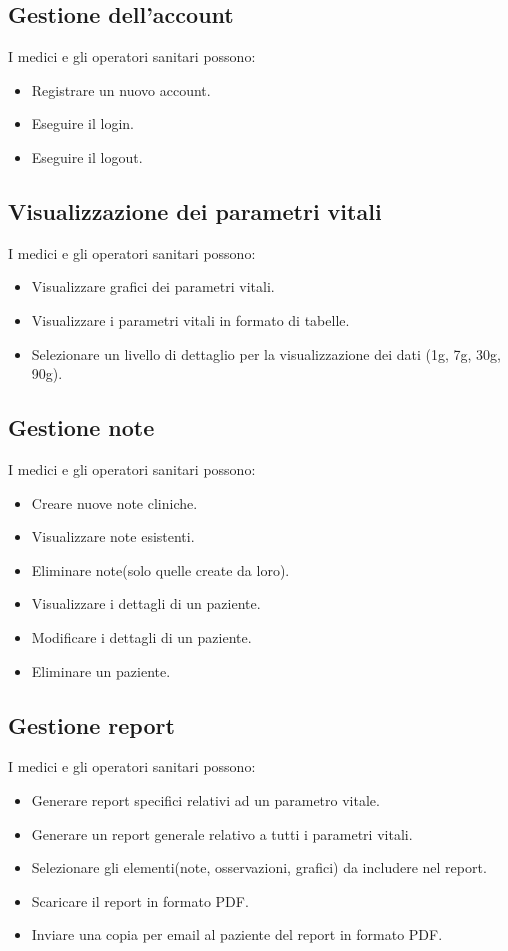 \documentclass[12pt,a4paper,oneside]{report}
\begin{document}
\subsection{Gestione dell'account}
I medici e gli operatori sanitari possono:
\begin{itemize}
    \item Registrare un nuovo account.
    \item Eseguire il login.
    \item Eseguire il logout.
\end{itemize}
\subsection{Visualizzazione dei parametri vitali}
I medici e gli operatori sanitari possono:
\begin{itemize}
    \item Visualizzare grafici dei parametri vitali.
    \item Visualizzare i parametri vitali in formato di tabelle.
    \item Selezionare un livello di dettaglio per la visualizzazione dei dati (1g, 7g, 30g, 90g).
\end{itemize}
\subsection{Gestione note}
I medici e gli operatori sanitari possono:
\begin{itemize}
    \item Creare nuove note cliniche.
    \item Visualizzare note esistenti.
    \item Eliminare note(solo quelle create da loro).
    \item Visualizzare i dettagli di un paziente.
    \item Modificare i dettagli di un paziente.
    \item Eliminare un paziente.
\end{itemize}
\subsection{Gestione report}
I medici e gli operatori sanitari possono:
\begin{itemize}
    \item Generare report specifici relativi ad un parametro vitale.
    \item Generare un report generale relativo a tutti i parametri vitali.
    \item Selezionare gli elementi(note, osservazioni, grafici) da includere nel report.
    \item Scaricare il report in formato PDF.
    \item Inviare una copia per email al paziente del report in formato PDF.
\end{itemize}
\end{document}
